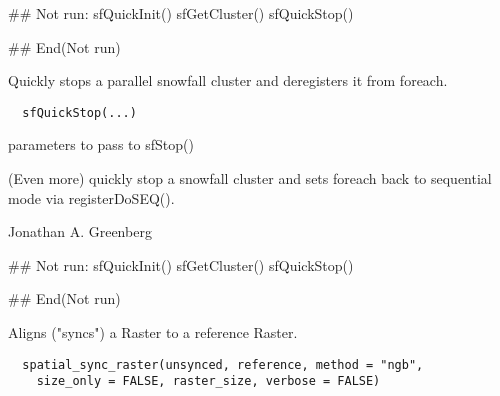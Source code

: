 \documentclass[a4paper]{book}
\begin{document}
%
\begin{Examples}
\begin{ExampleCode}
## Not run: 
sfQuickInit()
sfGetCluster()
sfQuickStop()

## End(Not run)
\end{ExampleCode}
\end{Examples}
%
\begin{Description}\relax
Quickly stops a parallel snowfall cluster and deregisters
it from foreach.
\end{Description}
%
\begin{Usage}
\begin{verbatim}
  sfQuickStop(...)
\end{verbatim}
\end{Usage}
%
\begin{Arguments}
\begin{ldescription}
\item[\code{...}] parameters to pass to sfStop()
\end{ldescription}
\end{Arguments}
%
\begin{Details}\relax
(Even more) quickly stop a snowfall cluster and sets
foreach back to sequential mode via registerDoSEQ().
\end{Details}
%
\begin{Author}\relax
Jonathan A. Greenberg
\end{Author}
%
\begin{SeeAlso}\relax
{}
\end{SeeAlso}
%
\begin{Examples}
\begin{ExampleCode}
## Not run: 
sfQuickInit()
sfGetCluster()
sfQuickStop()

## End(Not run)
\end{ExampleCode}
\end{Examples}
%
\begin{Description}\relax
Aligns ("syncs") a Raster to a reference Raster.
\end{Description}
%
\begin{Usage}
\begin{verbatim}
  spatial_sync_raster(unsynced, reference, method = "ngb",
    size_only = FALSE, raster_size, verbose = FALSE)
\end{verbatim}
\end{Usage}
\end{document}
